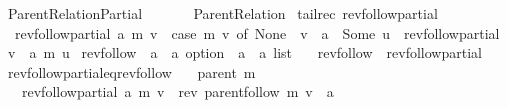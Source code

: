 %
\begin{isabellebody}%
%
%
\isadeliminvisible
%
\endisadeliminvisible
%
\isataginvisible
{}\isamarkupfalse%
\ Parent{\isacharunderscore}{\kern0pt}Relation{\isacharunderscore}{\kern0pt}Partial\isanewline
\ \ \isanewline
\ \ \ \ Parent{\isacharunderscore}{\kern0pt}Relation\isanewline
{}\isanewline
\isanewline
{}\isamarkupfalse%
\ {\isacharparenleft}{\kern0pt}tailrec{\isacharparenright}{\kern0pt}\ rev{\isacharunderscore}{\kern0pt}follow{\isacharunderscore}{\kern0pt}partial\ \isanewline
\ \ {\isachardoublequoteopen}rev{\isacharunderscore}{\kern0pt}follow{\isacharunderscore}{\kern0pt}partial\ a\ m\ v\ {\isacharequal}{\kern0pt}\ {\isacharparenleft}{\kern0pt}case\ m\ v\ of\ None\ {\isasymRightarrow}\ v\ {\isacharhash}{\kern0pt}\ a\ {\isacharbar}{\kern0pt}\ Some\ u\ {\isasymRightarrow}\ rev{\isacharunderscore}{\kern0pt}follow{\isacharunderscore}{\kern0pt}partial\ {\isacharparenleft}{\kern0pt}v\ {\isacharhash}{\kern0pt}\ a{\isacharparenright}{\kern0pt}\ m\ u{\isacharparenright}{\kern0pt}{\isachardoublequoteclose}\isanewline
\isanewline
{}\isamarkupfalse%
\ rev{\isacharunderscore}{\kern0pt}follow\ {\isacharcolon}{\kern0pt}{\isacharcolon}{\kern0pt}\ {\isachardoublequoteopen}{\isacharparenleft}{\kern0pt}{\isacharprime}{\kern0pt}a\ {\isasymRightarrow}\ {\isacharprime}{\kern0pt}a\ option{\isacharparenright}{\kern0pt}\ {\isasymRightarrow}\ {\isacharprime}{\kern0pt}a\ {\isasymRightarrow}\ {\isacharprime}{\kern0pt}a\ list{\isachardoublequoteclose}\ \isanewline
\ \ {\isachardoublequoteopen}rev{\isacharunderscore}{\kern0pt}follow\ {\isasymequiv}\ rev{\isacharunderscore}{\kern0pt}follow{\isacharunderscore}{\kern0pt}partial\ {\isacharbrackleft}{\kern0pt}{\isacharbrackright}{\kern0pt}{\isachardoublequoteclose}\isanewline
\isanewline
{}\isamarkupfalse%
\ rev{\isacharunderscore}{\kern0pt}follow{\isacharunderscore}{\kern0pt}partial{\isacharunderscore}{\kern0pt}eq{\isacharunderscore}{\kern0pt}rev{\isacharunderscore}{\kern0pt}follow{\isacharcolon}{\kern0pt}\isanewline
\ \ \ {\isachardoublequoteopen}parent\ m{\isachardoublequoteclose}\isanewline
\ \ \ {\isachardoublequoteopen}rev{\isacharunderscore}{\kern0pt}follow{\isacharunderscore}{\kern0pt}partial\ a\ m\ v\ {\isacharequal}{\kern0pt}\ rev\ {\isacharparenleft}{\kern0pt}parent{\isachardot}{\kern0pt}follow\ m\ v{\isacharparenright}{\kern0pt}\ {\isacharat}{\kern0pt}\ a{\isachardoublequoteclose}%

\end{isabellebody}
